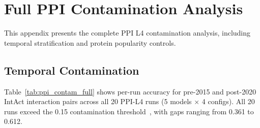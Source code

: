 \section{Full PPI Contamination Analysis}
\label{app:contamination}

This appendix presents the complete PPI L4 contamination analysis, including temporal stratification and protein popularity controls.

\subsection{Temporal Contamination}

Table~\ref{tab:ppi_contam_full} shows per-run accuracy for pre-2015 and post-2020 IntAct interaction pairs across all 20 PPI-L4 runs (5 models $\times$ 4 configs). All 20 runs exceed the 0.15 contamination threshold~\citep{balloccu2024leak}, with gaps ranging from 0.361 to 0.612.


